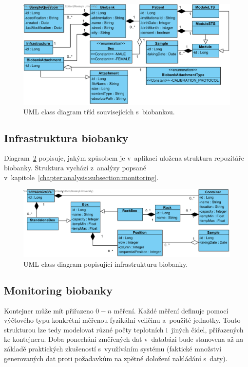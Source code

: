 \documentclass[11pt, final, oneside]{fithesis2}
\begin{document}
\begin{figure}[h!]
\begin{center}
	\includegraphics[width=\textwidth]{BiobankView}
\caption{UML class diagram tříd souvisejících s~biobankou.}
\label{fig:index:uml:class:biobank}
\end{center}
\end{figure}

\subsection{Infrastruktura biobanky}
Diagram~\ref{fig:index:uml:class:infrastructure} popisuje, jakým způsobem je v~aplikaci uložena struktura repozitáře biobanky. Struktura vychází z~analýzy popsané v~kapitole~\ref{chapter:analysis:subsection:monitoring}.

\begin{figure}[h!]
\begin{center}
	\includegraphics[width=\textwidth]{InfrastructureView}
\caption{UML class diagram popisující infrastrukturu biobanky.}
\label{fig:index:uml:class:infrastructure}
\end{center}
\end{figure}

\subsection{Monitoring biobanky}
Kontejner může mít přiřazeno $0-n$ měření. Každé měření definuje pomocí výčtového typu konkrétní měřenou fyzikální veličinu a~použité jednotky. Touto strukturou lze tedy modelovat různé počty teplotních i~jiných čidel, přiřazených ke kontejneru. 
Doba ponechání změřených dat v~databázi bude stanovena až na základě praktických zkušeností s~využíváním systému (faktické množství generovaných dat proti požadavkům na zpětné doložení nakládání s~daty).
\end{document}

